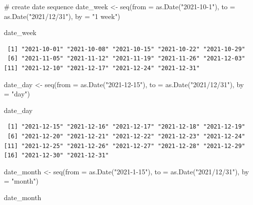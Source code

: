 \documentclass[
  letterpaper,
  DIV=11,
  numbers=noendperiod]{scrreprt}
\newenvironment{Shaded}{\begin{snugshade}}{\end{snugshade}}
\newcommand{\AttributeTok}[1]{\textcolor[rgb]{0.40,0.45,0.13}{#1}}
\newcommand{\CommentTok}[1]{\textcolor[rgb]{0.37,0.37,0.37}{#1}}
\newcommand{\FunctionTok}[1]{\textcolor[rgb]{0.28,0.35,0.67}{#1}}
\newcommand{\NormalTok}[1]{\textcolor[rgb]{0.00,0.23,0.31}{#1}}
\newcommand{\OtherTok}[1]{\textcolor[rgb]{0.00,0.23,0.31}{#1}}
\newcommand{\StringTok}[1]{\textcolor[rgb]{0.13,0.47,0.30}{#1}}
\begin{document}
\begin{Shaded}
\begin{Highlighting}[]
\CommentTok{\# create date sequence }
\NormalTok{date\_week }\OtherTok{\textless{}{-}} \FunctionTok{seq}\NormalTok{(}\AttributeTok{from =} \FunctionTok{as.Date}\NormalTok{(}\StringTok{"2021{-}10{-}1"}\NormalTok{), }
    \AttributeTok{to =} \FunctionTok{as.Date}\NormalTok{(}\StringTok{"2021/12/31"}\NormalTok{), }
    \AttributeTok{by =} \StringTok{"1 week"}\NormalTok{)}

\NormalTok{date\_week}
\end{Highlighting}
\end{Shaded}

\begin{verbatim}
 [1] "2021-10-01" "2021-10-08" "2021-10-15" "2021-10-22" "2021-10-29"
 [6] "2021-11-05" "2021-11-12" "2021-11-19" "2021-11-26" "2021-12-03"
[11] "2021-12-10" "2021-12-17" "2021-12-24" "2021-12-31"
\end{verbatim}

\begin{Shaded}
\begin{Highlighting}[]
\NormalTok{date\_day }\OtherTok{\textless{}{-}} \FunctionTok{seq}\NormalTok{(}\AttributeTok{from =} \FunctionTok{as.Date}\NormalTok{(}\StringTok{"2021{-}12{-}15"}\NormalTok{), }
    \AttributeTok{to =} \FunctionTok{as.Date}\NormalTok{(}\StringTok{"2021/12/31"}\NormalTok{), }
    \AttributeTok{by =} \StringTok{"day"}\NormalTok{)}

\NormalTok{date\_day}
\end{Highlighting}
\end{Shaded}

\begin{verbatim}
 [1] "2021-12-15" "2021-12-16" "2021-12-17" "2021-12-18" "2021-12-19"
 [6] "2021-12-20" "2021-12-21" "2021-12-22" "2021-12-23" "2021-12-24"
[11] "2021-12-25" "2021-12-26" "2021-12-27" "2021-12-28" "2021-12-29"
[16] "2021-12-30" "2021-12-31"
\end{verbatim}

\begin{Shaded}
\begin{Highlighting}[]
\NormalTok{date\_month }\OtherTok{\textless{}{-}} \FunctionTok{seq}\NormalTok{(}\AttributeTok{from =} \FunctionTok{as.Date}\NormalTok{(}\StringTok{"2021{-}1{-}15"}\NormalTok{), }
    \AttributeTok{to =} \FunctionTok{as.Date}\NormalTok{(}\StringTok{"2021/12/31"}\NormalTok{), }
    \AttributeTok{by =} \StringTok{"month"}\NormalTok{)}

\NormalTok{date\_month}
\end{Highlighting}
\end{Shaded}
\end{document}
